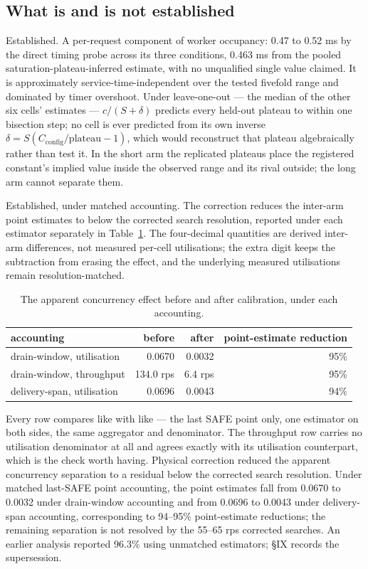 \documentclass{ieeeaccess}
\begin{document}
\subsection{What is and is not established}

Established. A per-request component of worker occupancy: 0.47 to 0.52 ms by the direct timing probe across its three conditions, 0.463 ms from the pooled saturation-plateau-inferred estimate, with no unqualified single value claimed. It is approximately service-time-independent over the tested fivefold range and dominated by timer overshoot. Under leave-one-out --- the median of the other six cells' estimates --- $c/(S + \delta)$ predicts every held-out plateau to within one bisection step; no cell is ever predicted from its own inverse $\delta = S(C_{\mathrm{config}}/\mathrm{plateau} - 1)$, which would reconstruct that plateau algebraically rather than test it. In the short arm the replicated plateaus place the registered constant's implied value inside the observed range and its rival outside; the long arm cannot separate them.

Established, under matched accounting. The correction reduces the inter-arm point estimates to below the corrected search resolution, reported under each estimator separately in Table~\ref{tab:accounting}. The four-decimal quantities are derived inter-arm differences, not measured per-cell utilisations; the extra digit keeps the subtraction from erasing the effect, and the underlying measured utilisations remain resolution-matched.

\begin{table}[!t]
\caption[The apparent concurrency effect before and after calibration, under each accounting.]{The apparent concurrency effect before and after calibration, under each accounting.}
\label{tab:accounting}
\centering
\footnotesize
\begin{tabular}{lrrr}
\hline
{\bfseries accounting} & {\bfseries before} & {\bfseries after} & {\bfseries point-estimate reduction} \\ \hline
drain-window, utilisation & 0.0670 & 0.0032 & 95\% \\
drain-window, throughput & 134.0 rps & 6.4 rps & 95\% \\
delivery-span, utilisation & 0.0696 & 0.0043 & 94\% \\
\hline
\end{tabular}
\end{table}

Every row compares like with like --- the last SAFE point only, one estimator on both sides, the same aggregator and denominator. The throughput row carries no utilisation denominator at all and agrees exactly with its utilisation counterpart, which is the check worth having. Physical correction reduced the apparent concurrency separation to a residual below the corrected search resolution. Under matched last-SAFE point accounting, the point estimates fall from 0.0670 to 0.0032 under drain-window accounting and from 0.0696 to 0.0043 under delivery-span accounting, corresponding to 94--95\% point-estimate reductions; the remaining separation is not resolved by the 55--65 rps corrected searches. An earlier analysis reported 96.3\% using unmatched estimators; \S{}IX records the supersession.
\end{document}
